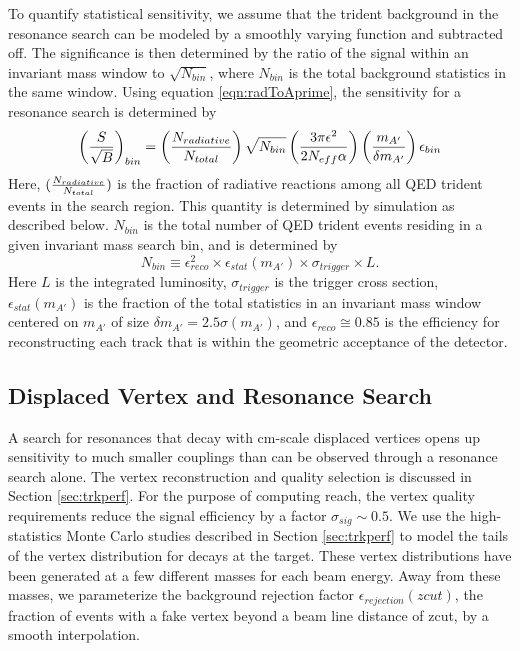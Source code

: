 To quantify statistical sensitivity, we assume that the trident background in the 
resonance search can be modeled by a smoothly varying function and subtracted off. 
The significance is then determined by the ratio of the signal within an invariant mass 
window to $\sqrt{N_{bin}}$, where $N_{bin}$ is the total background statistics in the 
same window. Using equation \ref{eqn:radToAprime}, the sensitivity for a resonance search is determined by
\begin{equation}
 \left({{S} \over {\sqrt{B}}}\right)_{bin}=\left({{N_{radiative}} \over {N_{total}}}\right) \sqrt{N_{bin}} 
\left({{3\pi \epsilon^2} \over {2 N_{eff}\alpha}}\right)\left({{m_{A'}} \over {\delta m_{A'}}}\right)
\epsilon_{bin}
\label{eqn:signifBumpHunt}
\end{equation}   
Here, $({{N_{radiative}} \over {N_{total}}})$ is the fraction of radiative reactions 
among all QED trident events in the search region. This quantity is determined by 
simulation as described below. $N_{bin}$ is the total number of QED trident events 
residing in a given invariant mass search bin, and is determined by
\begin{equation}
 N_{bin} \equiv \epsilon_{reco}^2 \times \epsilon_{stat}(m_{A'})
 \times \sigma_{trigger} \times L.
\end{equation}
Here $L$ is the integrated luminosity, $\sigma_{trigger}$ is the trigger cross section, 
$\epsilon_{stat} (m_{A'})$ is the fraction of the total statistics in an invariant 
mass window centered on $m_{A'}$ of size  $\delta m_{A'} =2.5 \sigma (m_{A'})$, 
and $\epsilon_{reco} \cong 0.85$ is the efficiency for reconstructing each track that is 
within the geometric acceptance of the detector. 

\subsection{ Displaced Vertex and Resonance Search}

A search for resonances that decay with cm-scale displaced vertices opens up sensitivity 
to much smaller couplings than can be observed through a resonance search alone.  
The vertex reconstruction and quality selection is discussed in Section \ref{sec:trkperf}.   
For the purpose of computing reach, the vertex quality requirements 
reduce the signal efficiency by a factor  $\sigma_{sig}\sim 0.5$.  
We use the high-statistics Monte Carlo studies described in 
Section \ref{sec:trkperf} to model the tails of the vertex distribution for decays at the target.  
These vertex distributions have been generated at a few different masses for each beam energy. 
Away from  these masses, we parameterize the background rejection factor $\epsilon_{rejection} (zcut)$,
 the fraction of events with a fake vertex beyond a beam line distance of zcut, 
by a smooth interpolation.

